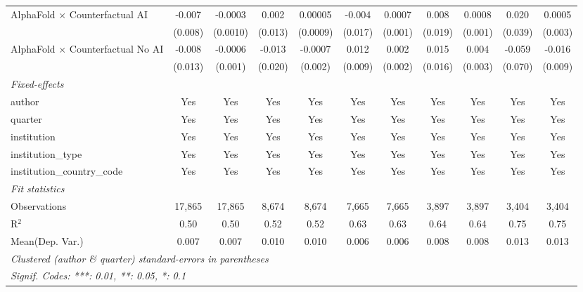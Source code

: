 \begin{tabular}{lcccccccccc}
   AlphaFold $\times$ Counterfactual AI     & -0.007  & -0.0003  & 0.002   & 0.00005  & -0.004  & 0.0007  & 0.008   & 0.0008  & 0.020         & 0.0005\\   
                                            & (0.008) & (0.0010) & (0.013) & (0.0009) & (0.017) & (0.001) & (0.019) & (0.001) & (0.039)       & (0.003)\\   
   AlphaFold $\times$ Counterfactual No AI  & -0.008  & -0.0006  & -0.013  & -0.0007  & 0.012   & 0.002   & 0.015   & 0.004   & -0.059        & -0.016\\   
                                            & (0.013) & (0.001)  & (0.020) & (0.002)  & (0.009) & (0.002) & (0.016) & (0.003) & (0.070)       & (0.009)\\   
   \midrule
   \emph{Fixed-effects}\\
   author                                   & Yes     & Yes      & Yes     & Yes      & Yes     & Yes     & Yes     & Yes     & Yes           & Yes\\  
   quarter                                  & Yes     & Yes      & Yes     & Yes      & Yes     & Yes     & Yes     & Yes     & Yes           & Yes\\  
   institution                              & Yes     & Yes      & Yes     & Yes      & Yes     & Yes     & Yes     & Yes     & Yes           & Yes\\  
   institution\_type                        & Yes     & Yes      & Yes     & Yes      & Yes     & Yes     & Yes     & Yes     & Yes           & Yes\\  
   institution\_country\_code               & Yes     & Yes      & Yes     & Yes      & Yes     & Yes     & Yes     & Yes     & Yes           & Yes\\  
   \midrule
   \emph{Fit statistics}\\
   Observations                             & 17,865  & 17,865   & 8,674   & 8,674    & 7,665   & 7,665   & 3,897   & 3,897   & 3,404         & 3,404\\  
   R$^2$                                    & 0.50    & 0.50     & 0.52    & 0.52     & 0.63    & 0.63    & 0.64    & 0.64    & 0.75          & 0.75\\  
Mean(Dep. Var.) & 0.007 & 0.007 & 0.010 & 0.010 & 0.006 & 0.006 & 0.008 & 0.008 & 0.013 & 0.013 \\
   \midrule \midrule
   \multicolumn{11}{l}{\emph{Clustered (author \& quarter) standard-errors in parentheses}}\\
   \multicolumn{11}{l}{\emph{Signif. Codes: ***: 0.01, **: 0.05, *: 0.1}}\\
\end{tabular}
\par\endgroup
